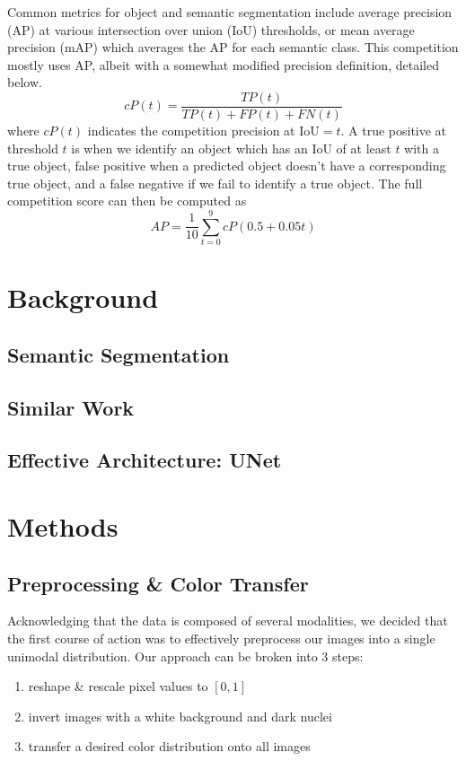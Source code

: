 \documentclass[paper=letter, fontsize=12pt]{article}
\numberwithin{equation}{section} %
\numberwithin{figure}{section} %
\numberwithin{table}{section} %
\begin{document}
Common metrics for object and semantic segmentation include average precision
(AP) at various intersection over union (IoU) thresholds, or mean average
precision (mAP) which averages the AP for each semantic class.  This
competition mostly uses AP, albeit with a somewhat modified precision
definition, detailed below.
\begin{equation}
    cP(t) = \frac{TP(t)}{TP(t) + FP(t) + FN(t)}
\end{equation}
where $cP(t)$ indicates the competition precision at $\text{IoU}=t$.  A true
positive at threshold $t$ is when we identify an object which has an IoU of at
least $t$ with a true object, false positive when a predicted object doesn't
have a corresponding true object, and a false negative if we fail to identify a
true object.  The full competition score can then be computed as
\begin{equation}
    AP = \frac{1}{10}\sum_{t = 0}^{9} cP(0.5 + 0.05t)
\end{equation}

\section{Background}

\subsection{Semantic Segmentation}

\subsection{Similar Work}

\subsection{Effective Architecture: UNet}

\section{Methods}

\subsection{Preprocessing \& Color Transfer}

Acknowledging that the data is composed of several modalities, we decided that
the first course of action was to effectively preprocess our images into a
single unimodal distribution.  Our approach can be broken into 3 steps:
\begin{enumerate}
    \item reshape \& rescale pixel values to $[0, 1]$
    \item invert images with a white background and dark nuclei
    \item transfer a desired color distribution onto all images
\end{enumerate}
\end{document}
